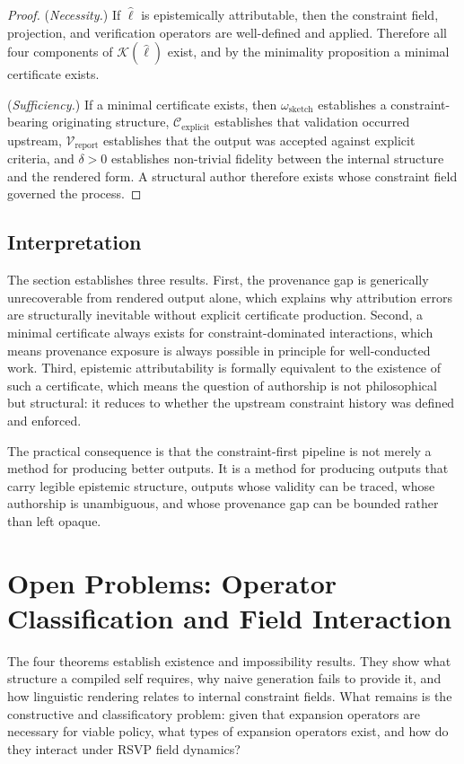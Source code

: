 \documentclass[12pt, a4paper]{article}
\theoremstyle{plain}
\theoremstyle{definition}
\theoremstyle{remark}
\begin{document}
\begin{proof}
(\textit{Necessity.}) If $\hat{\ell}$ is epistemically attributable, then the constraint field, projection, and verification operators are well-defined and applied. Therefore all four components of $\mathcal{K}(\hat{\ell})$ exist, and by the minimality proposition a minimal certificate exists.

(\textit{Sufficiency.}) If a minimal certificate exists, then $\omega_{\mathrm{sketch}}$ establishes a constraint-bearing originating structure, $\mathcal{C}_{\mathrm{explicit}}$ establishes that validation occurred upstream, $\mathcal{V}_{\mathrm{report}}$ establishes that the output was accepted against explicit criteria, and $\delta > 0$ establishes non-trivial fidelity between the internal structure and the rendered form. A structural author therefore exists whose constraint field governed the process.
\end{proof}

\subsection{Interpretation}

The section establishes three results. First, the provenance gap is generically unrecoverable from rendered output alone, which explains why attribution errors are structurally inevitable without explicit certificate production. Second, a minimal certificate always exists for constraint-dominated interactions, which means provenance exposure is always possible in principle for well-conducted work. Third, epistemic attributability is formally equivalent to the existence of such a certificate, which means the question of authorship is not philosophical but structural: it reduces to whether the upstream constraint history was defined and enforced.

The practical consequence is that the constraint-first pipeline is not merely a method for producing better outputs. It is a method for producing outputs that carry legible epistemic structure, outputs whose validity can be traced, whose authorship is unambiguous, and whose provenance gap can be bounded rather than left opaque.

\section{Open Problems: Operator Classification and Field Interaction}

The four theorems establish existence and impossibility results. They show what structure a compiled self requires, why naive generation fails to provide it, and how linguistic rendering relates to internal constraint fields. What remains is the constructive and classificatory problem: given that expansion operators are necessary for viable policy, what types of expansion operators exist, and how do they interact under RSVP field dynamics?
\end{document}
